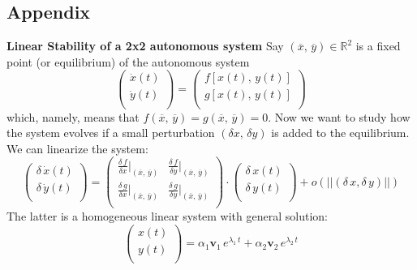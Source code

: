 \subsection*{Appendix}
\textbf{Linear Stability of a 2x2 autonomous system}
\label{app:bifurcation_diagram}
Say $(\overline{x},\, \overline{y})\in \mathbb{R}^2$ is a fixed point (or equilibrium) of the autonomous system 
\begin{equation*}
    \begin{pmatrix}
        \dot{x}(t) \\
        \dot{y}(t) \\
    \end{pmatrix}
    = 
        \begin{pmatrix}
        f[x(t),\, y(t)] \\
        g[x(t),\, y(t)] \\
    \end{pmatrix}
\end{equation*}
which, namely, means that $f(\overline{x},\, \overline{y}) = g(\overline{x},\, \overline{y}) = 0$. Now we want to study how the system evolves if a small perturbation $(\delta x,\, \delta y)$ is added to the equilibrium. We can linearize the system:
\begin{equation*}
    \begin{pmatrix}
        \delta\,\dot{x}(t) \\
        \delta\,\dot{y}(t) \\
    \end{pmatrix}
    = 
        \begin{pmatrix}
        \frac{\delta\,f}{\delta x}|_{(\overline{x},\,\overline{y})} & \frac{\delta\,f}{\delta y}|_{(\overline{x},\,\overline{y})}\\
        \frac{\delta\,g}{\delta x}|_{(\overline{x},\,\overline{y})} & \frac{\delta\,g}{\delta y}|_{(\overline{x},\,\overline{y})} \\
    \end{pmatrix}
    \cdot
        \begin{pmatrix}
        \delta\,x(t) \\
        \delta\,y(t) \\
    \end{pmatrix}
    +
    o(||(\delta\,x, \delta\,y)||)
\end{equation*}
 The latter is a homogeneous linear system with general solution:
\begin{equation*}
        \begin{pmatrix}
        x(t) \\
        y(t) \\
    \end{pmatrix}
     = 
     \alpha_1 \mathbf{v}_1\, e^{\lambda_1\, t} + \alpha_2 \mathbf{v}_2\, e^{\lambda_2\, t} 
\end{equation*}
